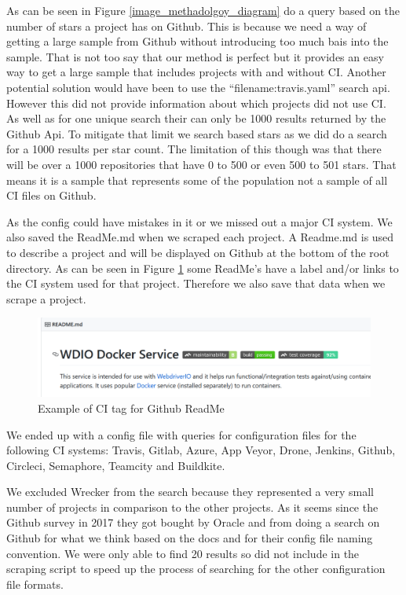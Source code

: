 \documentclass[twoside,12pt,titlepage,a4paper]{article}
\begin{document}
As can be seen in Figure \ref{image_methadolgoy_diagram} do a query based on the number of stars a project has on Github. This is because we need a way of getting a large sample from Github without introducing too much bais into the sample. That is not too say that our method is perfect but it provides an easy way to get a large sample that includes projects with and without CI.
Another potential solution would have been to use the \enquote{filename:travis.yaml} search api. However this did not provide information about which projects did not use CI. As well as for one unique search their can only be 1000 results returned by the Github Api. To mitigate that limit we search based stars as we did do a search for a 1000 results per star count. The limitation of this though was that there will be over a 1000 repositories that have 0 to 500 or even 500 to 501 stars. That means it is a sample that represents some of the population not a sample of all CI files on Github. 

As the config could have mistakes in it or we missed out a major CI system. We also saved the ReadMe.md when we scraped each project. A Readme.md is used to describe a project and will be displayed on Github at the bottom of the root directory. As can be seen in Figure \ref{ExampleGithubReadme} some ReadMe's have a label and/or links to the CI system used for that project. Therefore we also save that data when we scrape a project. 

\begin{figure}[h]
  \centering
  \includegraphics[scale=0.5, width=\textwidth]{2020-01-30-08-29-04.png}
  
  \caption[alt text]{Example of CI tag for Github ReadMe \cite{GithubReadMeExample}}
  \label{ExampleGithubReadme}
\end{figure}

We ended up with a config file with queries for configuration files for the following CI systems: Travis, Gitlab, Azure, App Veyor, Drone, Jenkins, Github, Circleci, Semaphore, Teamcity and Buildkite. 

We excluded Wrecker from the search because they represented a very small number of projects in comparison to the other projects. As it seems since the Github survey in 2017 they got bought by Oracle and from doing a search on Github for what we think based on the docs \cite{WreckerDocs} and \cite{WreckerOpenSourceGithubSearch} for their config file naming convention. We were only able to find 20 results so did not include in the scraping script to speed up the process of searching for the other configuration file formats.
\end{document}
